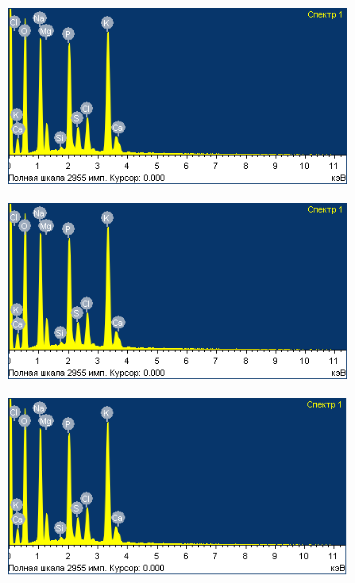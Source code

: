 \begin{figure}[H]
	\centering
	\includegraphics[width=0.8\textwidth]{media/pish/image53}
	\caption*{}
\end{figure}

\begin{figure}[H]
	\centering
	\includegraphics[width=0.8\textwidth]{media/pish/image53}
	\caption*{}
\end{figure}

\begin{figure}[H]
	\centering
	\includegraphics[width=0.8\textwidth]{media/pish/image54}
	\caption*{}
\end{figure}


